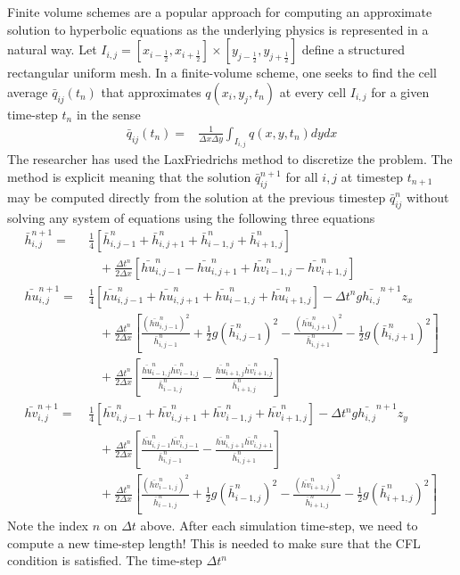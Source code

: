 \documentclass[10pt]{article}
\begin{document}
Finite volume schemes are a popular approach for computing an approximate
solution to hyperbolic equations as the underlying physics is represented
in a natural way. Let $I_{i,j}=\left[x_{i-\frac{1}{2}},x_{i+\frac{1}{2}}\right]\times\left[y_{j-\frac{1}{2}},y_{j+\frac{1}{2}}\right]$
define a structured rectangular uniform mesh. In a finite-volume scheme,
one seeks to find the cell average $\bar{q}_{ij}\left(t_{n}\right)$
that approximates $q\left(x_{i},y_{j},t_{n}\right)$ at every cell
$I_{i,j}$ for a given time-step $t_{n}$ in the sense 
\begin{align*}
\bar{q}_{ij}\left(t_{n}\right)= & \frac{1}{\Delta x\Delta y}\int_{I_{i,j}}q\left(x,y,t_{n}\right)dydx
\end{align*}
The researcher has used the Lax\textendash Friedrichs method to discretize
the problem. The method is explicit meaning that the solution $\bar{q}_{ij}^{n+1}$
for all $i,j$ at timestep $t_{n+1}$ may be computed directly from
the solution at the previous timestep $\bar{q}_{ij}^{n}$ without
solving any system of equations using the following three equations
\begin{align*}
\bar{h}_{i,j}^{n+1}= & \,\frac{1}{4}\left[\bar{h}_{i,j-1}^{n}+\bar{h}_{i,j+1}^{n}+\bar{h}_{i-1,j}^{n}+\bar{h}_{i+1,j}^{n}\right]\\
 & \quad+\frac{\Delta t^{n}}{2\Delta x}\left[\bar{hu}_{i,j-1}^{n}-\bar{hu}_{i,j+1}^{n}+\bar{hv}_{i-1,j}^{n}-\bar{hv}_{i+1,j}^{n}\right]\\
\bar{hu}_{i,j}^{n+1}= & \,\frac{1}{4}\left[\bar{hu}_{i,j-1}^{n}+\bar{hu}_{i,j+1}^{n}+\bar{hu}_{i-1,j}^{n}+\bar{hu}_{i+1,j}^{n}\right]-\Delta t^{n}g\bar{h_{i,j}}^{n+1}z_{x}\\
 & \quad+\frac{\Delta t^{n}}{2\Delta x}\left[\frac{\left(\bar{hu}_{i,j-1}^{n}\right)^{2}}{\bar{h}_{i,j-1}^{n}}+\frac{1}{2}g\left(\bar{h}_{i,j-1}^{n}\right)^{2}-\frac{\left(\bar{hu}_{i,j+1}^{n}\right)^{2}}{\bar{h}_{i,j+1}^{n}}-\frac{1}{2}g\left(\bar{h}_{i,j+1}^{n}\right)^{2}\right]\\
 & \quad+\frac{\Delta t^{n}}{2\Delta x}\left[\frac{\bar{hu}_{i-1,j}^{n}\bar{hv}_{i-1,j}^{n}}{\bar{h}_{i-1,j}^{n}}-\frac{\bar{hu}_{i+1,j}^{n}\bar{hv}_{i+1,j}^{n}}{\bar{h}_{i+1,j}^{n}}\right]\\
\bar{hv}_{i,j}^{n+1}= & \,\frac{1}{4}\left[\bar{hv}_{i,j-1}^{n}+\bar{hv}_{i,j+1}^{n}+\bar{hv}_{i-1,j}^{n}+\bar{hv}_{i+1,j}^{n}\right]-\Delta t^{n}g\bar{h_{i,j}}^{n+1}z_{y}\\
 & \quad+\frac{\Delta t^{n}}{2\Delta x}\left[\frac{\bar{hu}_{i,j-1}^{n}\bar{hv}_{i,j-1}^{n}}{\bar{h}_{i,j-1}^{n}}-\frac{\bar{hu}_{i,j+1}^{n}\bar{hv}_{i,j+1}^{n}}{\bar{h}_{i,j+1}^{n}}\right]\\
 & \quad+\frac{\Delta t^{n}}{2\Delta x}\left[\frac{\left(\bar{hv}_{i-1,j}^{n}\right)^{2}}{\bar{h}_{i-1,j}^{n}}+\frac{1}{2}g\left(\bar{h}_{i-1,j}^{n}\right)^{2}-\frac{\left(\bar{hv}_{i+1,j}^{n}\right)^{2}}{\bar{h}_{i+1,j}^{n}}-\frac{1}{2}g\left(\bar{h}_{i+1,j}^{n}\right)^{2}\right]
\end{align*}
Note the index $n$ on $\Delta t$ above. After each simulation time-step,
we need to compute a new time-step length! This is needed to make
sure that the CFL condition is satisfied. The time-step $\Delta t^{n}$ 
\end{document}
